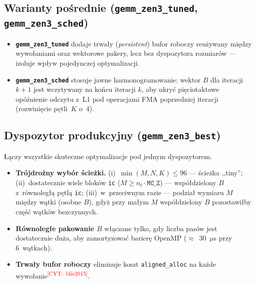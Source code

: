 \documentclass[a4paper,12pt]{book} %
\newcommand{\todocite}[1]{\textsuperscript{\textcolor{red}{[CYT:~#1]}}}
\newcommand{\kod}[1]{\texttt{#1}}
\begin{document}
\subsection{Warianty pośrednie (\kod{gemm\_zen3\_tuned}, \kod{gemm\_zen3\_sched})}
\begin{itemize}
\item \textbf{\kod{gemm\_zen3\_tuned}} dodaje trwały (\emph{persistent}) bufor
  roboczy reużywany między wywołaniami oraz wektorowe pakery, lecz bez dyspozytora
  rozmiarów --- izoluje wpływ pojedynczej optymalizacji.
\item \textbf{\kod{gemm\_zen3\_sched}} stosuje jawne harmonogramowanie: wektor $B$
  dla iteracji $k{+}1$ jest wczytywany na końcu iteracji $k$, aby ukryć
  pięciotaktowe opóźnienie odczytu z~L1 pod operacjami FMA poprzedniej iteracji
  (rozwinięcie pętli~$K$ o~4).
\end{itemize}

\subsection{Dyspozytor produkcyjny (\kod{gemm\_zen3\_best})}
Łączy wszystkie skuteczne optymalizacje pod jednym dyspozytorem.
\begin{itemize}
\item \textbf{Trójdrożny wybór ścieżki.} (i)~$\min(M,N,K)\le 96$ --- ścieżka
  ,,tiny''; (ii)~dostatecznie wiele bloków \kod{ic} ($M \ge n_t\cdot\kod{MC\_Z}$)
  --- współdzielony $B$ z~równoległą pętlą \kod{ic}; (iii)~w~przeciwnym razie
  --- podział wymiaru $M$ między wątki (osobne $B$), gdyż przy małym $M$
  współdzielony $B$ pozostawiłby część wątków bezczynnych.
\item \textbf{Równoległe pakowanie $B$} włączane tylko, gdy liczba pasów jest
  dostatecznie duża, aby zamortyzować barierę OpenMP ($\approx$~30~$\mu$s przy
  6~wątkach).
\item \textbf{Trwały bufor roboczy} eliminuje koszt \kod{aligned\_alloc} na każde
  wywołanie\todocite{blis2015}.
\end{itemize}
\end{document}
